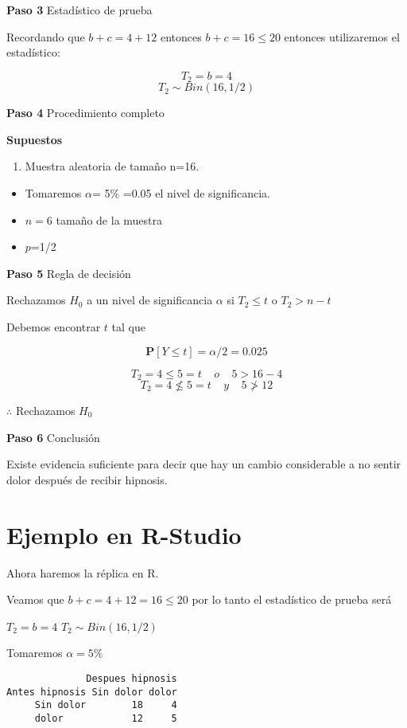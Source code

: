 \documentclass[
  a4paper,
  oneside,
  openany]{book}
\providecommand{\tightlist}{%
  \setlength{\itemsep}{0pt}\setlength{\parskip}{0pt}}
\begin{document}
\textbf{Paso 3} Estadístico de prueba

Recordando que \(b+c=4+12\) entonces \(b+c=16\leq20\) entonces utilizaremos el estadístico:

\[T_{2}=b=4\]
\[T_{2}\sim Bin(16,1/2)\]

\textbf{Paso 4} Procedimiento completo

\textbf{Supuestos}

\begin{enumerate}
\def\labelenumi{\arabic{enumi}.}
\tightlist
\item
  Muestra aleatoria de tamaño n=16.
\end{enumerate}

\begin{itemize}
\item
  Tomaremos \(\alpha\)= 5\% =0.05 el nivel de significancia.
\item
  \(n=6\) tamaño de la muestra
\item
  \(p\)=1/2
\end{itemize}

\textbf{Paso 5} Regla de decisión

Rechazamos \(H_0\) a un nivel de significancia \(\alpha\) si \(T_{2} \leq t\) o \(T_{2}>n-t\)

Debemos encontrar \(t\) tal que

\[\mathbf{P}[Y \leq t]=\alpha/2=0.025\]

\[T_{2}=4 \leq 5=t  \ \ \ \ \   o  \ \ \ \ \      5>16-4  \]
\[T_{2}=4 \nleq 5=t   \ \ \ \ \   y   \ \ \ \ \      5\ngtr12\]

\(\therefore\) Rechazamos \(H_0\)

\textbf{Paso 6} Conclusión

Existe evidencia suficiente para decir que hay un cambio considerable a no sentir dolor después de recibir hipnosis.

\hypertarget{ejemplo-en-r-studio-3}{%
\section{Ejemplo en R-Studio}\label{ejemplo-en-r-studio-3}}

Ahora haremos la réplica en R.

Veamos que \(b+c=4+12=16\leq 20\) por lo tanto el estadístico de prueba será

\(T_2=b=4\)
\(T_2\sim Bin(16,1/2)\)

Tomaremos \(\alpha=5\%\)

\begin{verbatim}
              Despues hipnosis
Antes hipnosis Sin dolor dolor
     Sin dolor        18     4
     dolor            12     5
\end{verbatim}
\end{document}
